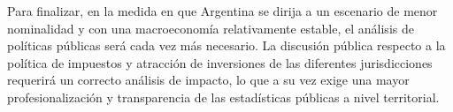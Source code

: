 Para finalizar, en la medida en que Argentina se dirija a un escenario de menor nominalidad y con una macroeconomía relativamente estable, el análisis de políticas públicas será cada vez más necesario. La discusión pública respecto a la política de impuestos y atracción de inversiones de las diferentes jurisdicciones requerirá un correcto análisis de impacto, lo que a su vez exige una mayor profesionalización y transparencia de las estadísticas públicas a nivel territorial.



